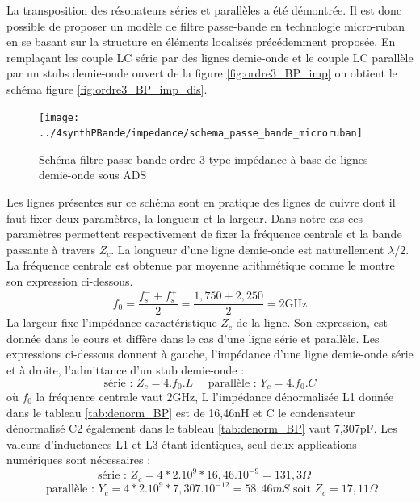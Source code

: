 \documentclass[french]{article}
\begin{document}
La transposition des résonateurs séries et parallèles a été démontrée. Il est donc possible de proposer un modèle de filtre passe-bande en technologie micro-ruban en se basant sur la structure en éléments localisés précédemment proposée. En remplaçant les couple LC série par des lignes demie-onde et le couple LC parallèle par un stubs demie-onde ouvert de la figure \ref{fig:ordre3_BP_imp} on obtient le schéma figure \ref{fig:ordre3_BP_imp_dis}.
\begin{figure}[H]
	\centering
	\texttt{[image: ../4synthPBande/impedance/schema\_passe\_bande\_microruban]}
	\caption{Schéma filtre passe-bande ordre 3 type impédance à base de lignes demie-onde sous ADS}
	\label{fig:ads_sch_BP_localise}
\end{figure}
Les lignes présentes sur ce schéma sont en pratique des lignes de cuivre dont il faut fixer deux paramètres, la longueur et la largeur. Dans notre cas ces paramètres permettent respectivement de fixer la fréquence centrale et la bande passante à travers $Z_c$. La longueur d'une ligne demie-onde est naturellement $\lambda /2$. La fréquence centrale est obtenue par moyenne arithmétique comme le montre son expression ci-dessous. 
\begin{equation}
f_0 = \frac{f_s^-+f_s^+}{2}=\frac{1,750+2,250}{2}=2\text{GHz}
\end{equation}
La largeur fixe l'impédance caractéristique $Z_c$ de la ligne. Son expression, est donnée dans le cours \cite{cours_HF} et diffère dans le cas d'une ligne série et parallèle. Les expressions ci-dessous donnent à gauche, l'impédance d'une ligne demie-onde série et à droite, l'admittance d'un stub demie-onde : 
\begin{equation}
	\text{série : } Z_c = 4.f_0.L \quad \text{ parallèle : } Y_c=4.f_0.C
\end{equation} 
où $f_0$ la fréquence centrale vaut $2\text{GHz}$, L l'impédance dénormalisée L1 donnée dans le tableau \ref{tab:denorm_BP} est de 16,46nH et C le condensateur dénormalisé C2 également dans le tableau \ref{tab:denorm_BP} vaut 7,307pF. Les valeurs d'inductances L1 et L3 étant identiques, seul deux applications numériques sont nécessaires :
\begin{equation}
\text{série : } Z_c = 4*2.10^{9}*16,46.10^{-9}=131,3\Omega \quad 
\end{equation}
\begin{equation}
\text{ parallèle : }
 Y_c=4*2.10^{9}*7,307.10^{-12} = 58,46mS \text{ soit } Z_c=17,11\Omega
\end{equation}
\end{document}
